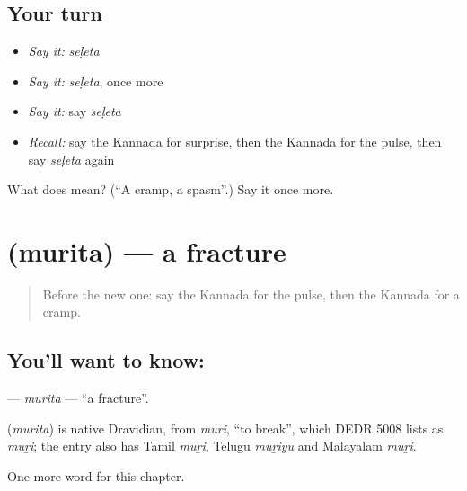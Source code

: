 \subsection*{Your turn}
\begin{itemize}
\raggedright
  \item \emph{Say it:} \emph{seḷeta}
  \item \emph{Say it:} \emph{seḷeta}, once more
  \item \emph{Say it:} say \emph{seḷeta}
  \item \emph{Recall:} say the Kannada for surprise, then the Kannada for the pulse, then say \emph{seḷeta} again
\end{itemize}

\begin{tcolorbox}[breakable,colback=teal!4,colframe=teal!35!black,title={Before you move on}]
What does  mean? (\textquotedblleft{}A cramp, a spasm\textquotedblright{}.) Say it once more.
\end{tcolorbox}
\section[\texorpdfstring{\kn{ಮುರಿತ} (murita)}{ಮುರಿತ (murita)}]{ (murita) — a fracture}

\label{lesson:KA-C283-murita}



\begin{quote}
Before the new one: say the Kannada for the pulse, then the Kannada for a cramp.
\end{quote}

\subsection*{You'll want to know: }
\textbf{} — \emph{murita} — \textquotedblleft{}a fracture\textquotedblright{}.

\begin{cousinweb}
\textbf{} (\emph{murita}) is native Dravidian, from \emph{muri}, \textquotedblleft{}to break\textquotedblright{}, which DEDR 5008 lists as \emph{muṟi}; the entry also has Tamil \emph{muṟi}, Telugu \emph{muṟiyu} and Malayalam \emph{muṟi}.
\end{cousinweb}

\begin{grammarlens}[title={What you've built}]
One more word for this chapter.
\end{grammarlens}

